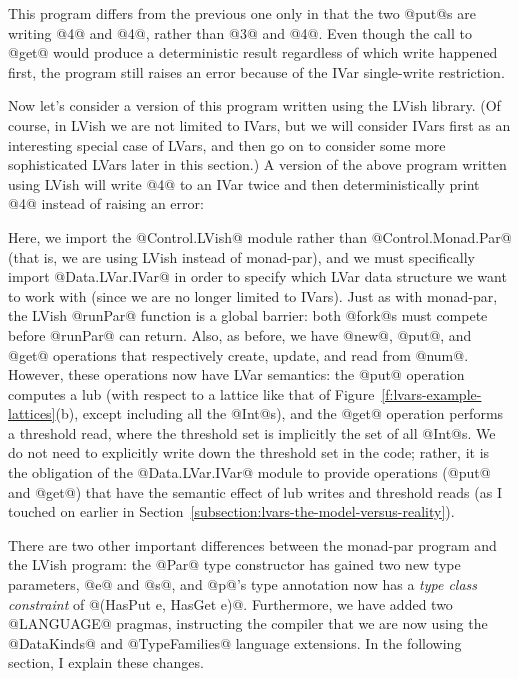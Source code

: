 This program differs from the previous one only in that the two @put@s
are writing @4@ and @4@, rather than @3@ and @4@.  Even though the
call to @get@ would produce a deterministic result regardless of which
write happened first, the program still raises an error because of the
IVar single-write restriction.

Now let's consider a version of this program written using the LVish
library.  (Of course, in LVish we are not limited to IVars, but we
will consider IVars first as an interesting special case of LVars, and
then go on to consider some more sophisticated LVars later in this
section.)  A version of the above program written using LVish will
write @4@ to an IVar twice and then deterministically print @4@
instead of raising an error:

\singlespacing

\doublespacing

Here, we import the @Control.LVish@ module rather than
@Control.Monad.Par@ (that is, we are using LVish instead of
monad-par), and we must specifically import @Data.LVar.IVar@ in order
to specify which LVar data structure we want to work with (since we
are no longer limited to IVars).  Just as with monad-par, the LVish
@runPar@ function is a global barrier: both @fork@s must compete
before @runPar@ can return.  Also, as before, we have @new@, @put@,
and @get@ operations that respectively create, update, and read from
@num@.  However, these operations now have LVar semantics: the @put@
operation computes a lub (with respect to a lattice like that of
Figure~\ref{f:lvars-example-lattices}(b), except including all the
@Int@s), and the @get@ operation performs a threshold read, where the
threshold set is implicitly the set of all @Int@s.  We do not need to
explicitly write down the threshold set in the code; rather, it is the
obligation of the @Data.LVar.IVar@ module to provide operations (@put@
and @get@) that have the semantic effect of lub writes and threshold
reads (as I touched on earlier in
Section~\ref{subsection:lvars-the-model-versus-reality}).

There are two other important differences between the monad-par
program and the LVish program: the @Par@ type constructor has gained
two new type parameters, @e@ and @s@, and @p@'s type annotation now
has a \emph{type class constraint} of @(HasPut e, HasGet e)@.
Furthermore, we have added two @LANGUAGE@ pragmas, instructing the
compiler that we are now using the @DataKinds@ and @TypeFamilies@
language extensions.  In the following section, I explain these
changes.

